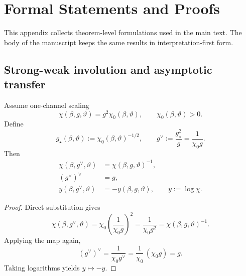 \section{Formal Statements and Proofs}
\label{sec:appendix_proofs}

This appendix collects theorem-level formulations used in the main text.
The body of the manuscript keeps the same results in interpretation-first form.

\subsection{Strong-weak involution and asymptotic transfer}

\begin{theorem}
\label{thm:strong_weak_involution_app}
Assume one-channel scaling
\begin{equation}
  \chi(\beta,g,\vartheta)=g^2\chi_0(\beta,\vartheta),\qquad \chi_0(\beta,\vartheta)>0.
\end{equation}
Define
\begin{equation}
  g_\star(\beta,\vartheta):=\chi_0(\beta,\vartheta)^{-1/2},
  \qquad
  g^\vee:=\frac{g_\star^2}{g}=\frac{1}{\chi_0 g}.
\end{equation}
Then
\begin{align}
  \chi(\beta,g^\vee,\vartheta) &= \chi(\beta,g,\vartheta)^{-1}, \\
  (g^\vee)^\vee &= g, \\
  y(\beta,g^\vee,\vartheta) &= -y(\beta,g,\vartheta),\qquad y:=\log\chi.
\end{align}
\end{theorem}
\begin{proof}
Direct substitution gives
\begin{equation}
  \chi(\beta,g^\vee,\vartheta)
  =\chi_0\left(\frac{1}{\chi_0 g}\right)^2
  =\frac{1}{\chi_0 g^2}
  =\chi(\beta,g,\vartheta)^{-1}.
\end{equation}
Applying the map again,
\begin{equation}
  (g^\vee)^\vee=\frac{1}{\chi_0 g^\vee}=\frac{1}{\chi_0}\,(\chi_0 g)=g.
\end{equation}
Taking logarithms yields \(y\mapsto-y\).
\end{proof}

